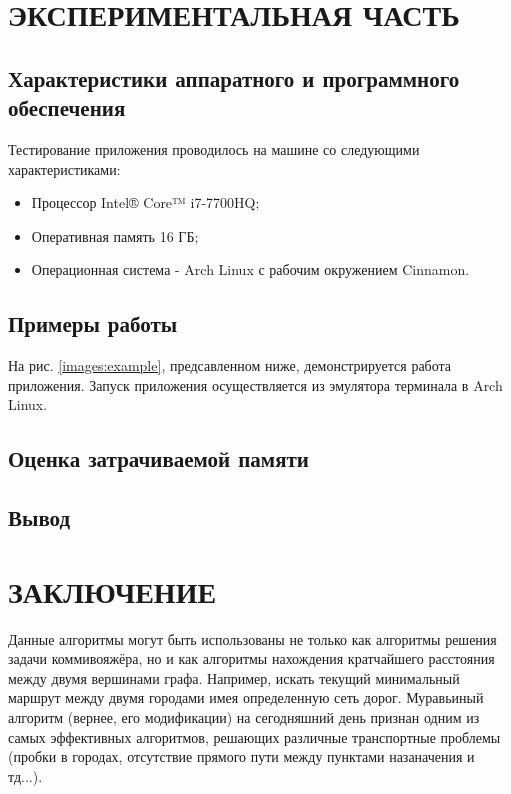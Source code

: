 \documentclass[a4paper,12pt]{article}
\newcommand{\anonsection}[1]{\section*{#1}\addcontentsline{toc}{section}{#1}}
\begin{document}
\newpage
\section{ЭКСПЕРИМЕНТАЛЬНАЯ ЧАСТЬ}
\subsection{Характеристики аппаратного и программного обеспечения}
Тестирование приложения проводилось на машине со следующими характеристиками:\\
\begin{itemize}
\item Процессор Intel® Core™ i7-7700HQ;
\item Оперативная память 16 ГБ;
\item Операционная система - Arch Linux с рабочим окружением Cinnamon.
\end{itemize}

\newpage
\subsection{Примеры работы}
На рис. \ref{images:example}, предсавленном ниже, демонстрируется работа приложения. Запуск приложения осуществляется из эмулятора терминала в Arch Linux.


\newpage
\subsection{Оценка затрачиваемой памяти}

\newpage
\subsection{Вывод}

\newpage
\anonsection{ЗАКЛЮЧЕНИЕ}
Данные алгоритмы могут быть использованы не только как алгоритмы решения задачи коммивояжёра, но и как алгоритмы нахождения кратчайшего расстояния между двумя вершинами графа. Например, искать текущий минимальный маршрут между двумя городами имея определенную сеть дорог.
Муравьиный алгоритм (вернее, его модификации) на сегодняшний день признан одним из самых эффективных алгоритмов, решающих различные транспортные проблемы (пробки в городах, отсутствие прямого пути между пунктами назаначения и тд...).
\end{document}
